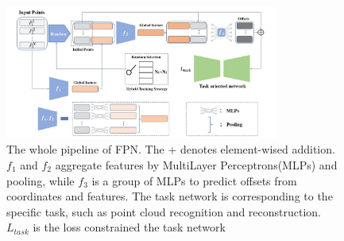 \documentclass{article}
\begin{document}
\begin{figure}
    \centering
    \includegraphics[width = 0.8\textwidth]{2.jpg}
    \caption{The whole pipeline of FPN. The + denotes element-wised addition. $f_1$ and $f_2$ aggregate features by MultiLayer Perceptrons(MLPs) and pooling, while $f_3$ is a group of MLPs to predict offsets from coordinates and features. The task network is corresponding to the specific task, such as point cloud recognition and reconstruction. $L_{task}$ is the loss constrained the task network}
    \label{figure 2}
\end{figure}
\end{document}
